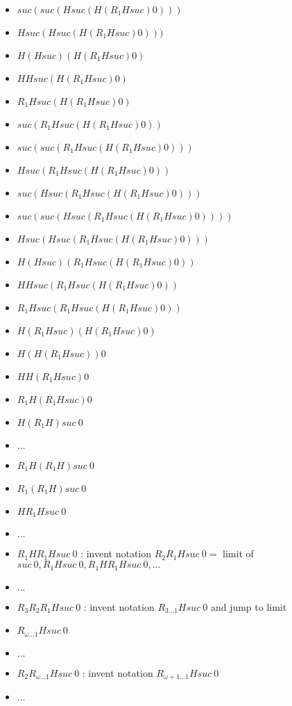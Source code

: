 \documentclass[10pt]{article}
\begin{document}
\begin{itemize}
\item \(    suc (suc (H suc (H (R_1 H suc) 0))) \)
\item \(    H suc (H suc (H (R_1 H suc) 0))) \)
\item \(    H (H suc) (H (R_1 H suc) 0) \)
\item \(    H H suc (H (R_1 H suc) 0) \)
\item \(    R_1 H suc (H (R_1 H suc) 0) \)
\item \(    suc (R_1 H suc (H (R_1 H suc) 0)) \)
\item \(    suc (suc (R_1 H suc (H (R_1 H suc) 0))) \)
\item \(    H suc (R_1 H suc (H (R_1 H suc) 0)) \)
\item \(    suc (H suc (R_1 H suc (H (R_1 H suc) 0))) \)
\item \(    suc (suc (H suc (R_1 H suc (H (R_1 H suc) 0)))) \)
\item \(    H suc (H suc (R_1 H suc (H (R_1 H suc) 0))) \)
\item \(    H (H suc) (R_1 H suc (H (R_1 H suc) 0)) \)
\item \(    H H suc (R_1 H suc (H (R_1 H suc) 0)) \)
\item \(    R_1 H suc (R_1 H suc (H (R_1 H suc) 0)) \)
\item \(    H (R_1 H suc) (H (R_1 H suc) 0) \)
\item \(    H (H (R_1 H suc)) 0 \)
\item \(    H H (R_1 H suc) 0 \)
\item \(    R_1 H (R_1 H suc) 0 \)
\item \(    H (R_1 H) suc\ 0 \)
\item \(    ... \)
\item \(    R_1 H (R_1 H) suc\ 0 \)
\item \(    R_1 (R_1 H) suc\ 0 \)
\item \(    H R_1 H suc\ 0 \)
\item \(    ... \)
\item \(    R_1 H R_1 H suc\ 0 \) : invent notation \( R_2 R_1 H suc\ 0 = \) limit of \( suc\ 0, R_1 H suc\ 0, R_1 H R_1 H suc\ 0, ... \)
\item \(    ... \)
\item \(    R_3 R_2 R_1 H suc\ 0 \) : invent notation \( R_{3...1} H suc\ 0 \) and jump to limit
\item \(    R_{\omega...1} H suc\ 0 \)
\item \(    ... \)
\item \(    R_2 R_{\omega...1} H suc\ 0 \) : invent notation \( R_{\omega+1...1} H suc\ 0 \)
\item \(    ...  \)

\end{itemize}
\end{document}
